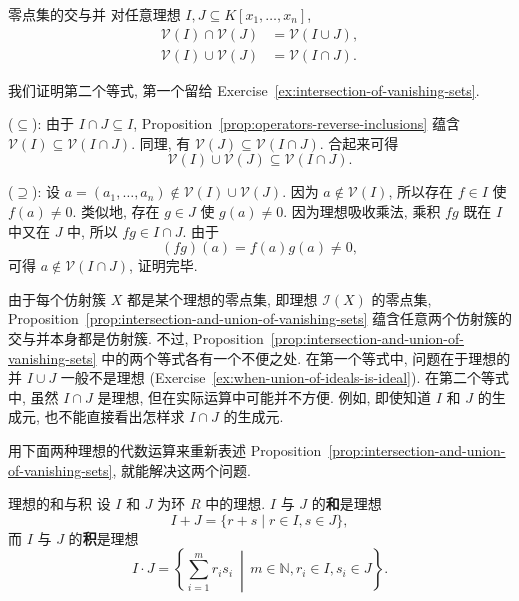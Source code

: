 \begin{Proposition}{零点集的交与并}\leavevmode\label{prop:intersection-and-union-of-vanishing-sets}
  对任意理想 $I,J\subseteq K[x_{1},\ldots,x_{n}]$,
  \[
    \begin{aligned}
      \mathcal{V}(I)\cap\mathcal{V}(J)&=\mathcal{V}(I\cup J),\\
      \mathcal{V}(I)\cup\mathcal{V}(J)&=\mathcal{V}(I\cap J).
    \end{aligned}
  \]
\end{Proposition}

\begin{Proof}
  我们证明第二个等式, 第一个留给 Exercise~\ref{ex:intersection-of-vanishing-sets}.

  ($\subseteq$): 由于 $I\cap J\subseteq I$, Proposition~\ref{prop:operators-reverse-inclusions} 蕴含 $\mathcal{V}(I)\subseteq\mathcal{V}(I\cap J)$. 同理, 有 $\mathcal{V}(J)\subseteq\mathcal{V}(I\cap J)$. 合起来可得
  \[
    \mathcal{V}(I)\cup\mathcal{V}(J)\subseteq\mathcal{V}(I\cap J).
  \]

  ($\supseteq$): 设 $a=(a_{1},\ldots,a_{n})\notin\mathcal{V}(I)\cup\mathcal{V}(J)$. 因为 $a\notin\mathcal{V}(I)$, 所以存在 $f\in I$ 使 $f(a)\ne0$. 类似地, 存在 $g\in J$ 使 $g(a)\ne0$. 因为理想吸收乘法, 乘积 $fg$ 既在 $I$ 中又在 $J$ 中, 所以 $fg\in I\cap J$. 由于
  \[
    (fg)(a)=f(a)g(a)\ne0,
  \]
  可得 $a\notin\mathcal{V}(I\cap J)$, 证明完毕.
\end{Proof}

由于每个仿射簇 $X$ 都是某个理想的零点集, 即理想 $\mathcal{I}(X)$ 的零点集, Proposition~\ref{prop:intersection-and-union-of-vanishing-sets} 蕴含任意两个仿射簇的交与并本身都是仿射簇. 不过, Proposition~\ref{prop:intersection-and-union-of-vanishing-sets} 中的两个等式各有一个不便之处. 在第一个等式中, 问题在于理想的并 $I\cup J$ 一般不是理想 (Exercise~\ref{ex:when-union-of-ideals-is-ideal}). 在第二个等式中, 虽然 $I\cap J$ 是理想, 但在实际运算中可能并不方便. 例如, 即使知道 $I$ 和 $J$ 的生成元, 也不能直接看出怎样求 $I\cap J$ 的生成元.

用下面两种理想的代数运算来重新表述 Proposition~\ref{prop:intersection-and-union-of-vanishing-sets}, 就能解决这两个问题.

\begin{Definition}{理想的和与积}\leavevmode\label{def:sum-and-product-of-ideals}
  设 $I$ 和 $J$ 为环 $R$ 中的理想. $I$ 与 $J$ 的\textbf{和}是理想
  \[
    I+J=\{r+s\mid r\in I,s\in J\},
  \]
  而 $I$ 与 $J$ 的\textbf{积}是理想
  \[
    I\cdot J=\left\{\sum_{i=1}^{m}r_{i}s_{i}\ \middle|\,
      m\in\mathbb{N},r_{i}\in I,s_{i}\in J\right\}.
  \]
\end{Definition}

